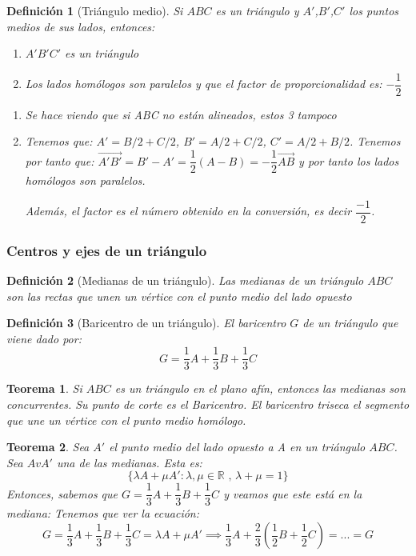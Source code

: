 \documentclass[11pt, a4paper, titlepage]{article}
\makeatletter
\renewenvironment{proof}[1][\proofname] {\vspace{-15pt}\par\pushQED{\qed}\normalfont\topsep6\p@\@plus6\p@\relax\trivlist\item[\hskip\labelsep\it#1\@addpunct{.}]\ignorespaces}{\popQED\endtrivlist\@endpefalse}
\newcommand{\R}{\mathbb{R}}
\theoremstyle{theorem-style}
\newtheorem*{nth}{Teorema}
\theoremstyle{definition-style}
\newtheorem*{ndef}{Definición}
\theoremstyle{remark-style}
\theoremstyle{example-style}
\newenvironment{nlist}
{\begin{enumerate}
\renewcommand\labelenumi{(\emph{\roman{enumi})}}}
{\end{enumerate}}
\makeatother
\begin{document}
\begin{ndef}[Triángulo medio]
	Si $ABC$ es un triángulo y $A'$,$B'$,$C'$ los puntos medios de sus lados, entonces:
	\begin{nlist}
	\item $A'B'C'$ es un triángulo
	\item Los lados homólogos son paralelos y que el factor de proporcionalidad es: $-\dfrac{1}{2}$
\end{nlist}\vspace{0.2cm}
\begin{proof}

	\begin{nlist}
	\item Se hace viendo que si ABC no están alineados, estos 3 tampoco
	\item Tenemos que: $A' = B/2 + C/2$, $B' = A/2+C/2$, $C' = A/2 + B/2$. Tenemos por tanto que: $\vec{A'B'} = B'-A' = \dfrac{1}{2}(A-B) = -\dfrac{1}{2} \vec{AB}$ y por tanto los lados homólogos son paralelos.

Además, el factor es el número obtenido en la conversión, es decir $\dfrac{-1}{2}$.
\end{nlist}
\end{proof}
\end{ndef}


\subsubsection{Centros y ejes de un triángulo}

\begin{ndef}[Medianas de un triángulo]
Las medianas de un triángulo $ABC$ son las rectas que unen un vértice con el punto medio del lado opuesto
\end{ndef}
\begin{ndef}[Baricentro de un triángulo]
	El baricentro $G$ de un triángulo que viene dado por:
	\[
	G = \dfrac{1}{3} A +  \dfrac{1}{3} B +  \dfrac{1}{3} C
	\]
\end{ndef}

\begin{nth}
	Si $ABC$ es un triángulo en el plano afín, entonces las medianas son concurrentes. Su punto de corte es el Baricentro. El baricentro triseca el segmento que une un vértice con el punto medio homólogo.


\end{nth}
	\begin{nth}
	Sea $A'$ el punto medio del lado opuesto a A en un triángulo $ABC$. Sea $AvA'$ una de las medianas. Esta es:
	\[
	\{\lambda A + \mu A': \lambda, \mu \in \R \text{ , } \lambda+\mu = 1\}
	\]
	Entonces, sabemos que $G = \dfrac{1}{3} A +  \dfrac{1}{3} B +  \dfrac{1}{3} C$ y veamos que este está en la mediana: Tenemos que ver la ecuación:
	\[
	G = \dfrac{1}{3} A +  \dfrac{1}{3} B +  \dfrac{1}{3} C = \lambda A + \mu A'  \implies \dfrac{1}{3}A + \dfrac{2}{3}(\dfrac{1}{2}B+\dfrac{1}{2}C) = ... = G
	\]

\end{nth}
\end{document}
